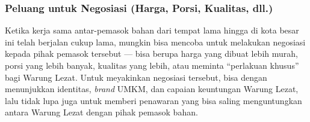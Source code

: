 \subsubsection{Peluang untuk Negosiasi (Harga, Porsi, Kualitas, dll.)}

Ketika kerja sama antar-pemasok bahan dari tempat lama hingga di kota besar ini telah berjalan cukup lama, mungkin bisa mencoba untuk melakukan negosiasi kepada pihak pemasok tersebut — bisa berupa harga yang dibuat lebih murah, porsi yang lebih banyak, kualitas yang lebih, atau meminta “perlakuan khusus” bagi Warung Lezat. Untuk meyakinkan negosiasi tersebut, bisa dengan menunjukkan identitas, \textit{brand} UMKM, dan capaian keuntungan Warung Lezat, lalu tidak lupa juga untuk memberi penawaran yang bisa saling menguntungkan antara Warung Lezat dengan pihak pemasok bahan.